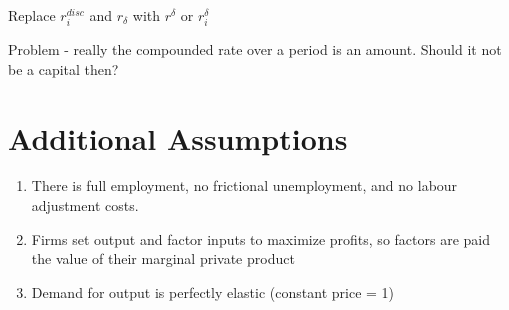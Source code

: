 Replace $r_i^{disc}$ and $r_\delta$ with
$r^\delta$ or $r_i^\delta$

Problem - really the compounded rate over a period is an amount. Should it not be a capital then?

\section{Additional Assumptions}
\begin{enumerate}
\item There is full employment, no frictional unemployment, and no labour adjustment costs.
\item Firms set output and factor inputs to maximize profits, so factors are paid the value of their marginal private product
\item Demand for output is perfectly elastic (constant price = 1)
\end{enumerate}
